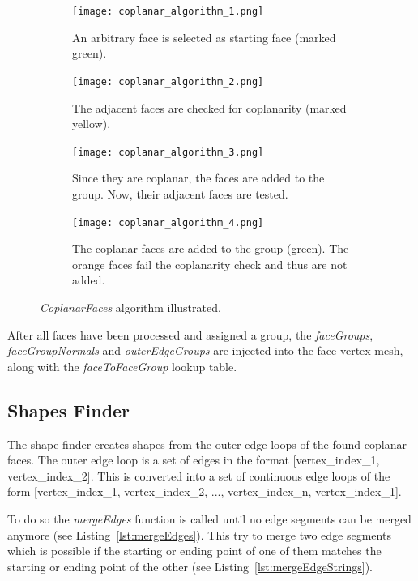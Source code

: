 \documentclass[../ClassicThesis.tex]{subfiles}
\begin{document}
\begin{figure}
  \centering
  \begin{subfigure}[t]{0.4\textwidth}
    \centering
    \texttt{[image: coplanar\_algorithm\_1.png]}
    \caption{An arbitrary face is selected as starting face (marked green).}
    \label{fig:coplanar_algorithm_1}
  \end{subfigure}
  \begin{subfigure}[t]{0.4\textwidth}
    \centering
    \texttt{[image: coplanar\_algorithm\_2.png]}
    \caption{The adjacent faces are checked for coplanarity (marked yellow).}
    \label{fig:coplanar_algorithm_2}
  \end{subfigure}
  \begin{subfigure}[t]{0.4\textwidth}
    \centering
    \texttt{[image: coplanar\_algorithm\_3.png]}
    \caption{Since they are coplanar, the faces are added to the group. Now, their adjacent faces are tested.}
    \label{fig:coplanar_algorithm_3}
  \end{subfigure}
  \begin{subfigure}[t]{0.4\textwidth}
    \centering
    \texttt{[image: coplanar\_algorithm\_4.png]}
    \caption{The coplanar faces are added to the group (green). The orange faces fail the coplanarity check and thus are not added.}
    \label{fig:coplanar_algorithm_4}
  \end{subfigure}
  \caption{\emph{CoplanarFaces} algorithm illustrated.}
  \label{fig:coplanar_algorithm}
\end{figure}

After all faces have been processed and assigned a group, the \emph{face\-Groups}, \emph{faceGroupNormals} and \emph{outerEdgeGroups} are injected into the face-vertex mesh, along with the \emph{faceToFaceGroup} lookup table.

\subsection{Shapes Finder}\label{sub:shapesfinder}

The shape finder creates shapes from the outer edge loops of the found coplanar faces. The outer edge loop is a set of edges in the format [vertex\_index\_1, vertex\_index\_2]. This is converted into a set of continuous edge loops of the form [vertex\_index\_1, vertex\_index\_2, ..., vertex\_index\_n, vertex\_index\_1].

To do so the \emph{mergeEdges} function is called until no edge segments can be merged anymore (see Listing~\ref{lst:mergeEdges}). This try to merge two edge segments which is possible if the starting or ending point of one of them matches the starting or ending point of the other (see Listing~\ref{lst:mergeEdgeStrings}).
\end{document}
